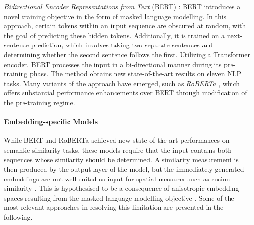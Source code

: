 \documentclass[11pt]{scrreprt}
\let\cite\parencite  %
\begin{document}

\textit{Bidirectional Encoder Representations from Text} (BERT) \cite{devlinBERTPretrainingDeep2019}: BERT introduces a novel training objective in the form of masked language modelling. In this approach, certain tokens within an input sequence are obscured at random, with the goal of predicting these hidden tokens. Additionally, it is trained on a next-sentence prediction, which involves taking two separate sentences and determining whether the second sentence follows the first. Utilizing a Transformer encoder, BERT processes the input in a bi-directional manner during its pre-training phase. The method obtains new state-of-the-art results on eleven NLP tasks. Many variants of the approach have emerged, such as \textit{RoBERTa} \cite{liuRoBERTaRobustlyOptimized2019}, which offers substantial performance enhancements over BERT through modification of the pre-training regime.






\paragraph{Embedding-specific Models} While BERT and RoBERTa achieved new state-of-the-art performances on semantic similarity tasks, these models require that the input contains both sequences whose similarity should be determined. A similarity measurement is then produced by the output layer of the model, but the immediately generated embeddings are not well suited as input for spatial measures such as cosine similarity \cite{reimersSentenceBERTSentenceEmbeddings2019}. This is hypothesised to be a consequence of anisotropic embedding spaces resulting from the masked language modelling objective \cite{liSentenceEmbeddingsPretrained2020}. Some of the most relevant approaches in resolving this limitation are presented in the following.
\end{document}
